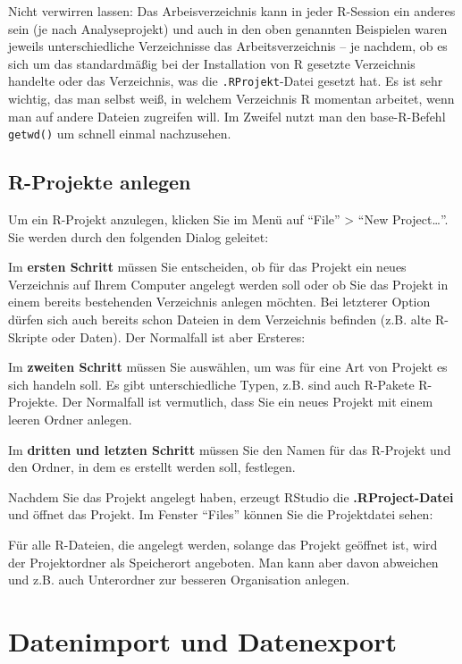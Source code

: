 \documentclass[
]{book}
\begin{document}
Nicht verwirren lassen: Das Arbeisverzeichnis kann in jeder R-Session ein anderes sein (je nach Analyseprojekt) und auch in den oben genannten Beispielen waren jeweils unterschiedliche Verzeichnisse das Arbeitsverzeichnis -- je nachdem, ob es sich um das standardmäßig bei der Installation von R gesetzte Verzeichnis handelte oder das Verzeichnis, was die \texttt{.RProjekt}-Datei gesetzt hat. Es ist sehr wichtig, das man selbst weiß, in welchem Verzeichnis R momentan arbeitet, wenn man auf andere Dateien zugreifen will. Im Zweifel nutzt man den base-R-Befehl \texttt{getwd()} um schnell einmal nachzusehen.

\hypertarget{r-projekte-anlegen}{%
\subsection{R-Projekte anlegen}\label{r-projekte-anlegen}}

Um ein R-Projekt anzulegen, klicken Sie im Menü auf ``File'' \textgreater{} ``New Project\ldots{}''. Sie werden durch den folgenden Dialog geleitet:

Im \textbf{ersten Schritt} müssen Sie entscheiden, ob für das Projekt ein neues Verzeichnis auf Ihrem Computer angelegt werden soll oder ob Sie das Projekt in einem bereits bestehenden Verzeichnis anlegen möchten. Bei letzterer Option dürfen sich auch bereits schon Dateien in dem Verzeichnis befinden (z.B. alte R-Skripte oder Daten). Der Normalfall ist aber Ersteres:

Im \textbf{zweiten Schritt} müssen Sie auswählen, um was für eine Art von Projekt es sich handeln soll. Es gibt unterschiedliche Typen, z.B. sind auch R-Pakete R-Projekte. Der Normalfall ist vermutlich, dass Sie ein neues Projekt mit einem leeren Ordner anlegen.

Im \textbf{dritten und letzten Schritt} müssen Sie den Namen für das R-Projekt und den Ordner, in dem es erstellt werden soll, festlegen.

Nachdem Sie das Projekt angelegt haben, erzeugt RStudio die \textbf{.RProject-Datei} und öffnet das Projekt. Im Fenster ``Files'' können Sie die Projektdatei sehen:

Für alle R-Dateien, die angelegt werden, solange das Projekt geöffnet ist, wird der Projektordner als Speicherort angeboten. Man kann aber davon abweichen und z.B. auch Unterordner zur besseren Organisation anlegen.

\hypertarget{datenimport-und-datenexport}{%
\section{Datenimport und Datenexport}\label{datenimport-und-datenexport}}
\end{document}
